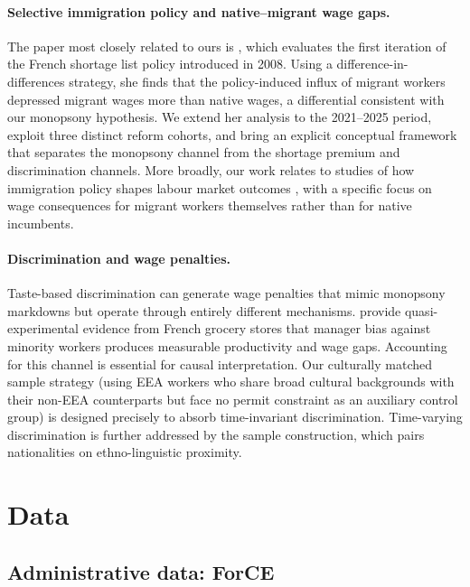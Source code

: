 \documentclass[9pt]{article}
\begin{document}
\paragraph{Selective immigration policy and native--migrant wage gaps.}
The paper most closely related to ours is \citet{Signorelli2024}, which evaluates
the first iteration of the French shortage list policy introduced in 2008. Using a
difference-in-differences strategy, she finds that the policy-induced influx of
migrant workers depressed migrant wages more than native wages, a differential
consistent with our monopsony hypothesis. We extend her analysis to the 2021--2025
period, exploit three distinct reform cohorts, and bring an explicit conceptual
framework that separates the monopsony channel from the shortage premium and
discrimination channels. More broadly, our work relates to studies of how immigration
policy shapes labour market outcomes \citep{Peri2012, Dustmann2017}, with a specific
focus on wage consequences for migrant workers themselves rather than for native
incumbents.

\paragraph{Discrimination and wage penalties.}
Taste-based discrimination \citep{Becker57} can generate wage penalties that mimic
monopsony markdowns but operate through entirely different mechanisms. \citet{Glover2017}
provide quasi-experimental evidence from French grocery stores that manager bias against
minority workers produces measurable productivity and wage gaps. Accounting for this
channel is essential for causal interpretation. Our culturally matched sample strategy
(using EEA workers who share broad cultural backgrounds with their non-EEA
counterparts but face no permit constraint as an auxiliary control group) is
designed precisely to absorb time-invariant discrimination. Time-varying discrimination
is further addressed by the sample construction, which pairs nationalities on
ethno-linguistic proximity.


\section{Data}
\label{sec:data}


\subsection{Administrative data: ForCE}
\end{document}
